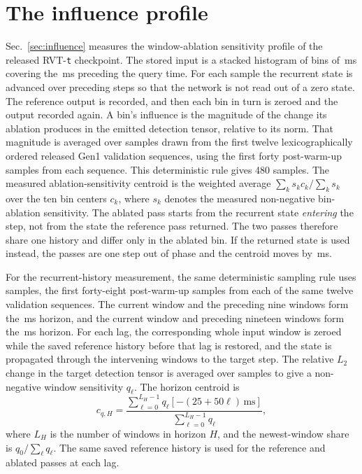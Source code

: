 \documentclass[10pt,twocolumn,letterpaper]{article}
\begin{document}
\section{The influence profile}
\label{sup:influence}

Sec.~\ref{sec:influence} measures the window-ablation sensitivity profile of the released
RVT-\texttt{t} checkpoint. The stored input is a stacked histogram of
\rvtBins{} bins of \rvtBinWidth\,ms covering the \rvtWindow\,ms preceding the
query time. For each sample the recurrent state is advanced over
\rvtWarmSteps{} preceding steps so that the network is not read out of a zero
state. The reference output is recorded, and then each bin in turn is zeroed and
the output recorded again. A bin's influence is the magnitude of the change its
ablation produces in the emitted detection tensor, relative to its norm. That
magnitude is averaged over
\rvtInfluenceSamples{} samples drawn from the first twelve lexicographically
ordered released Gen1 validation sequences, using the first forty post-warm-up
samples from each sequence. This deterministic rule gives 480 samples. The
measured ablation-sensitivity centroid is the weighted average
$\sum_{k}s_{k}c_{k}/\sum_{k}s_{k}$ over the ten bin centers $c_{k}$, where
$s_k$ denotes the measured non-negative bin-ablation sensitivity. The ablated pass starts from the recurrent
state \emph{entering} the step, not from the state the reference pass returned. The two
passes therefore share one history and differ only in the ablated bin. If the
returned state is used instead, the passes are one step out of phase and the centroid
moves by \rvtCentroidDiff\,ms.

For the recurrent-history measurement, the same deterministic sampling rule uses
\histSamples{} samples, the first forty-eight post-warm-up samples from each of the
same twelve validation sequences. The current window and the preceding nine windows
form the \histHorizonA\,ms horizon, and the current window and preceding nineteen windows
form the \histHorizonB\,ms horizon. For each lag, the corresponding whole input window
is zeroed while the saved reference history before that lag is restored, and the state
is propagated through the intervening windows to the target step. The relative $L_{2}$
change in the target detection tensor is averaged over samples to give a non-negative
window sensitivity $q_{\ell}$. The horizon centroid is
\[
c_{q,H}=\frac{\sum_{\ell=0}^{L_H-1}q_{\ell}[-(25+50\ell)\,\mathrm{ms}]}
{\sum_{\ell=0}^{L_H-1}q_{\ell}},
\]
where $L_H$ is the number of windows in horizon $H$, and the newest-window share is
$q_{0}/\sum_{\ell}q_{\ell}$. The same saved reference
history is used for the reference and ablated passes at each lag.
\end{document}
